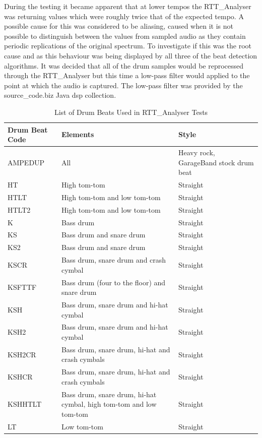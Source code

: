\documentclass[a4paper, 11pt]{article}
\begin{document}
During the testing it became apparent that at lower tempos the RTT\_Analyser was returning values which were roughly twice that of the expected tempo. A possible cause for this was considered to be aliasing, caused when it is not possible to distinguish between the values from sampled audio as they contain periodic replications of the original spectrum\cite{lyons}. To investigate if this was the root cause and as this behaviour was being displayed by all three of the beat detection algorithms. It was decided that all of the drum samples would be reprocessed through the RTT\_Analyser but this time a low-pass filter would applied to the point at which the audio is captured. The low-pass filter was provided by the source\_code.biz Java dsp collection.

\begin{table}[htbp]
\caption{List of Drum Beats Used in RTT\_Analyser Tests} 
\centering
\begin{tabular}{|p{3cm}|p{5cm}|l|}
\hline
\textbf{Drum Beat Code} & \textbf{Elements} & \textbf{Style} \\ [0.5ex]
\hline 
AMPEDUP & All & Heavy rock, GarageBand stock drum beat\\
\hline 
HT & High tom-tom & Straight\\
\hline 
HTLT & High tom-tom and low tom-tom & Straight\\
\hline 
HTLT2 & High tom-tom and low tom-tom & Straight\\
\hline 
K & Bass drum & Straight\\
\hline 
KS & Bass drum and snare drum & Straight\\
\hline 
KS2 & Bass drum and snare drum & Straight\\
\hline 
KSCR & Bass drum, snare drum and crash cymbal & Straight\\
\hline 
KSFTTF & Bass drum (four to the floor) and snare drum & Straight\\
\hline 
KSH & Bass drum, snare drum and hi-hat cymbal & Straight\\
\hline 
KSH2 & Bass drum, snare drum and hi-hat cymbal & Straight\\
\hline 
KSH2CR & Bass drum, snare drum, hi-hat and crash cymbals & Straight\\
\hline 
KSHCR & Bass drum, snare drum, hi-hat and crash cymbals & Straight\\
\hline 
KSHHTLT & Bass drum, snare drum, hi-hat cymbal, high tom-tom and low tom-tom & Straight\\
\hline 
LT & Low tom-tom & Straight\\

\end{tabular}
\end{table}
\end{document}
